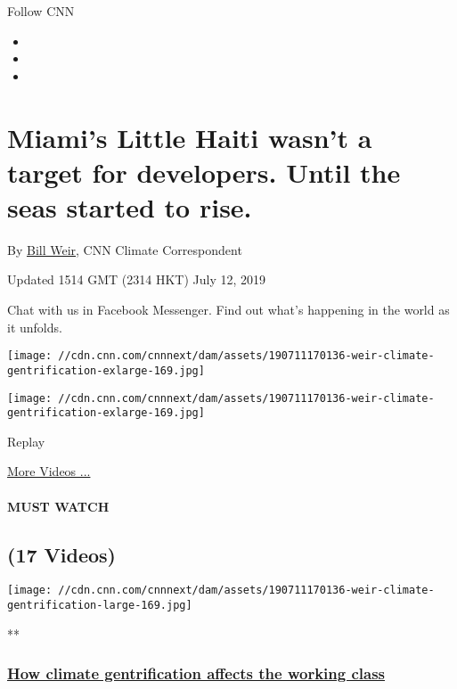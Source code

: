 Follow CNN

\begin{itemize}
\item
\item
\item
\end{itemize}

\hypertarget{miamis-little-haiti-wasnt-a-target-for-developers-until-the-seas-started-to-rise}{%
\section{Miami's Little Haiti wasn't a target for developers. Until the
seas started to
rise.}\label{miamis-little-haiti-wasnt-a-target-for-developers-until-the-seas-started-to-rise}}

By \href{/profiles/bill-weir-profile}{Bill Weir}, CNN Climate
Correspondent

Updated 1514 GMT (2314 HKT) July 12, 2019

Chat with us in Facebook Messenger. Find out what's happening in the
world as it unfolds.

\texttt{[image: //cdn.cnn.com/cnnnext/dam/assets/190711170136-weir-climate-gentrification-exlarge-169.jpg]}

\texttt{[image: //cdn.cnn.com/cnnnext/dam/assets/190711170136-weir-climate-gentrification-exlarge-169.jpg]}\href{javascript:void(0);}{}

Replay

\href{/videos}{More Videos ...}

\hypertarget{must-watch}{%
\paragraph{MUST WATCH}\label{must-watch}}

\hypertarget{17-videos}{%
\subsection{(17 Videos)}\label{17-videos}}

\href{/videos/us/2019/07/11/climate-gentrification-high-water-ground-weir-pkg-vpx.cnn/video/playlists/top-news-videos/}{}

\texttt{[image: //cdn.cnn.com/cnnnext/dam/assets/190711170136-weir-climate-gentrification-large-169.jpg]}

**

\hypertarget{how-climate-gentrification-affects-the-working-class}{%
\subsubsection{\texorpdfstring{\href{/videos/us/2019/07/11/climate-gentrification-high-water-ground-weir-pkg-vpx.cnn/video/playlists/top-news-videos/}{How
climate gentrification affects the working
class}}{How climate gentrification affects the working class}}\label{how-climate-gentrification-affects-the-working-class}}

